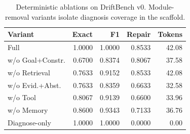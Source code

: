 \begin{table}[t]
\centering
\scriptsize
\setlength{\tabcolsep}{3pt}
\begin{tabular}{lrrrr}
\toprule
Variant & Exact & F1 & Repair & Tokens \\
\midrule
Full & 1.0000 & 1.0000 & 0.8533 & 42.08 \\
w/o Goal+Constr. & 0.6700 & 0.8374 & 0.8067 & 37.58 \\
w/o Retrieval & 0.7633 & 0.9152 & 0.8533 & 42.08 \\
w/o Evid.+Abst. & 0.7633 & 0.8359 & 0.6633 & 32.58 \\
w/o Tool & 0.8067 & 0.9139 & 0.6600 & 33.96 \\
w/o Memory & 0.8600 & 0.9343 & 0.7133 & 36.76 \\
Diagnose-only & 1.0000 & 1.0000 & 0.0000 & 0.00 \\
\bottomrule
\end{tabular}
\caption{Deterministic ablations on DriftBench v0. Module-removal variants isolate diagnosis coverage in the scaffold.}
\label{tab:v0-ablation}
\end{table}
